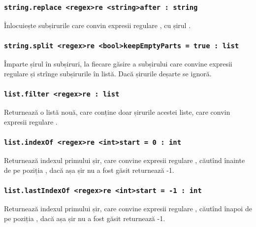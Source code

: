 \subsubsection{\lstinline|string.replace <regex>re <string>after : string|}

Înlocuiește subșirurile care convin expresii regulare , cu șirul .

\subsubsection{\lstinline|string.split <regex>re <bool>keepEmptyParts = true : list|}

Împarte șirul în subșiruri, la fiecare găsire a subșirului care convine expresii regulare  și strînge subșirurile în listă. Dacă  șirurile deșarte se ignoră.

\subsubsection{\lstinline|list.filter <regex>re : list|}

Returnează o listă nouă, care conține doar șirurile acestei liste, care convin expresii regulare .

\subsubsection{\lstinline|list.indexOf <regex>re <int>start = 0 : int|}

Returnează indexul primului șir, care convine expresii regulare , căutînd înainte de pe poziția , dacă așa șir nu a fost găsit returnează -1.

\subsubsection{\lstinline|list.lastIndexOf <regex>re <int>start = -1 : int|}

Returnează indexul primului șir, care convine expresii regulare , căutînd înapoi de pe poziția , dacă așa șir nu a fost găsit returnează -1.


